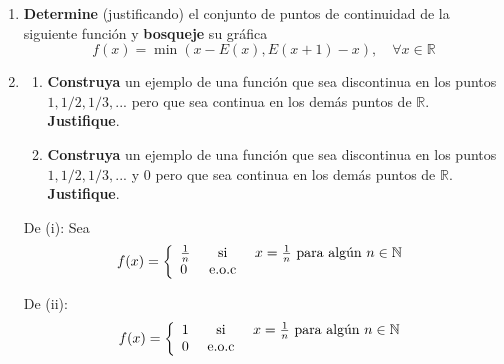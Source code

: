 \documentclass[12pt]{article}
\begin{document}
\begin{enumerate}
    \begin{sol}
    \end{sol}

    \item \textbf{Determine} (justificando) el conjunto de puntos de continuidad de la siguiente función y \textbf{bosqueje} su gráfica
    \begin{equation*}
        f(x)=\min(x-E(x),E(x+1)-x),\quad\forall x\in\mathbb{R}
    \end{equation*}

    \begin{sol}
    \end{sol}

    \item \begin{enumerate}
        \item \textbf{Construya} un ejemplo de una función que sea discontinua en los puntos $1,1/2,1/3,...$ pero que sea continua en los demás puntos de $\mathbb{R}$. \textbf{Justifique}.
        \item \textbf{Construya} un ejemplo de una función que sea discontinua en los puntos $1,1/2,1/3,...$ y $0$ pero que sea continua en los demás puntos de $\mathbb{R}$. \textbf{Justifique}.
    \end{enumerate}

    \begin{sol}
        De (i): Sea
        \begin{equation*}
            f(x)=\left\{
                \begin{array}{lcr}
                    \frac{1}{n} & \textup{ si } & x=\frac{1}{n}\textup{ para algún }n\in\mathbb{N}\\
                    0 & \textup{ e.o.c } & \\
                \end{array}
            \right.
        \end{equation*}

        De (ii):
        \begin{equation*}
            f(x)=\left\{
                \begin{array}{lcr}
                    1 & \textup{ si } & x=\frac{1}{n}\textup{ para algún }n\in\mathbb{N}\\
                    0 & \textup{ e.o.c } & \\
                \end{array}
            \right.
        \end{equation*}
    \end{sol}


\end{enumerate}
\end{document}
